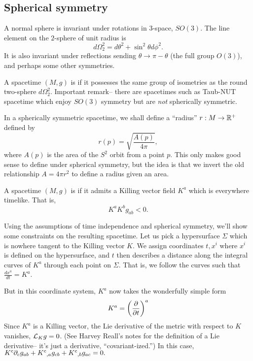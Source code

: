 \subsection*{Spherical symmetry} A normal sphere is invariant under rotations in $3$-space, $SO(3)$. The line element on the $2$-sphere of unit radius is
\begin{equation*}
    d\Omega_2^2 = d\theta^2 +\sin^2\theta d\phi^2.
\end{equation*}
It is also invariant under reflections sending $\theta\to \pi-\theta$ (the full group $O(3)$), and perhaps some other symmetries.

\begin{defn}
A spacetime $(M,g)$ is  if it possesses the same group of isometries as the round two-sphere $d\Omega_2^2$. Important remark-- there are spacetimes such as Taub-NUT spacetime which enjoy $SO(3)$ symmetry but are \emph{not} spherically symmetric.
\end{defn}

In a spherically symmetric spacetime, we shall define a ``radius'' $r:M\to \RR^+$ defined by 
\begin{equation*}
    r(p) =\sqrt{\frac{A(p)}{4\pi}},
\end{equation*}
where $A(p)$ is the area of the $S^2$ orbit from a point $p$. This only makes good sense to define under spherical symmetry, but the idea is that we invert the old relationship $A=4\pi r^2$ to define a radius given an area.

\begin{defn}
    A spacetime $(M,g)$ is  if it admits a Killing vector field $K^a$ which is everywhere timelike. That is,
    \begin{equation*}
        K^a K^b g_{ab} < 0.
    \end{equation*}
\end{defn}

Using the assumptions of time independence and spherical symmetry, we'll show some constraints on the resulting spacetime. Let us pick a hypersurface $\Sigma$ which is nowhere tangent to the Killing vector $K$. We assign coordinates $t,x^i$ where $x^i$ is defined on the hypersurface, and $t$ then describes a distance along the integral curves of $K^a$ through each point on $\Sigma$. That is, we follow the curves such that $\frac{dx^a}{dt}=K^a$.

But in this coordinate system, $K^a$ now takes the wonderfully simple form \begin{equation*}
    K^a= \left(\P{}{t}\right)^a
\end{equation*}
Since $K^a$ is a Killing vector, the Lie derivative of the metric with respect to $K$ vanishes,
$\cL_K g=0$. (See Harvey Reall's notes for the definition of a Lie derivative-- it's just a derivative, ``covariant-ized.'') In this case, $K^c \p_c g_{ab}+K^c{}_{,a} g_{cb}+K^c{}_{,b}g_{ac}=0.$

